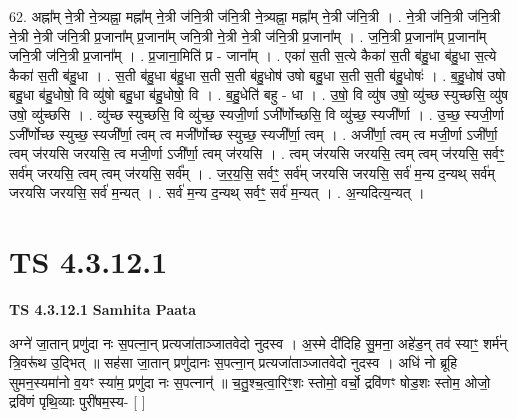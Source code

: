 \documentclass[17pt]{extarticle}
\begin{document}
62. अह्ना᳚म् ने॒त्री ने॒त्र्यह्ना॒ मह्ना᳚म् ने॒त्री ज॑नि॒त्री ज॑नि॒त्री ने॒त्र्यह्ना॒ मह्ना᳚म् ने॒त्री ज॑नि॒त्री । . ने॒त्री ज॑नि॒त्री ज॑नि॒त्री ने॒त्री ने॒त्री ज॑नि॒त्री प्र॒जाना᳚म् प्र॒जाना᳚म् जनि॒त्री ने॒त्री ने॒त्री ज॑नि॒त्री प्र॒जाना᳚म् । . ज॒नि॒त्री प्र॒जाना᳚म् प्र॒जाना᳚म् जनि॒त्री ज॑नि॒त्री प्र॒जाना᳚म् । . प्र॒जाना॒मिति॑ प्र - जाना᳚म् । . एका॑ स॒ती स॒त्ये कैका॑ स॒ती ब॑हु॒धा ब॑हु॒धा स॒त्ये कैका॑ स॒ती ब॑हु॒धा । . स॒ती ब॑हु॒धा ब॑हु॒धा स॒ती स॒ती ब॑हु॒धोष॑ उषो बहु॒धा स॒ती स॒ती ब॑हु॒धोषः॑ । . ब॒हु॒धोष॑ उषो बहु॒धा ब॑हु॒धोषो॒ वि व्यु॑षो बहु॒धा ब॑हु॒धोषो॒ वि । . ब॒हु॒धेति॑ बहु - धा । . उ॒षो॒ वि व्यु॑ष उषो॒ व्यु॑च्छ स्युच्छसि॒ व्यु॑ष उषो॒ व्यु॑च्छसि । . व्यु॑च्छ स्युच्छसि॒ वि व्यु॑च्छ॒ स्यजी॒र्णा ऽजी᳚र्णोच्छसि॒ वि व्यु॑च्छ॒ स्यजी᳚र्णा । . उ॒च्छ॒ स्यजी॒र्णा ऽजी᳚र्णोच्छ स्युच्छ॒ स्यजी᳚र्णा॒ त्वम् त्व मजी᳚र्णोच्छ स्युच्छ॒ स्यजी᳚र्णा॒ त्वम् । . अजी᳚र्णा॒ त्वम् त्व मजी॒र्णा ऽजी᳚र्णा॒ त्वम् ज॑रयसि जरयसि॒ त्व मजी॒र्णा ऽजी᳚र्णा॒ त्वम् ज॑रयसि । . त्वम् ज॑रयसि जरयसि॒ त्वम् त्वम् ज॑रयसि॒ सर्वꣳ॒॒ सर्व॑म् जरयसि॒ त्वम् त्वम् ज॑रयसि॒ सर्व᳚म् । . ज॒र॒य॒सि॒ सर्वꣳ॒॒ सर्व॑म् जरयसि जरयसि॒ सर्व॑ म॒न्य द॒न्यथ् सर्व॑म् जरयसि जरयसि॒ सर्व॑ म॒न्यत् । . सर्व॑ म॒न्य द॒न्यथ् सर्वꣳ॒॒ सर्व॑ म॒न्यत् । . अ॒न्यदित्य॒न्यत् । \newline
\pagebreak
{}

\section{ TS 4.3.12.1 }

\textbf{TS 4.3.12.1 } \newline
\textbf{Samhita Paata} \newline

अग्ने॑ जा॒तान् प्रणु॑दा नः स॒पत्ना॒न् प्रत्यजा॑ताञ्जातवेदो नुदस्व । अ॒स्मे दी॑दिहि सु॒मना॒ अहे॑ड॒न् तव॑ स्याꣳ॒॒ शर्म॑न् त्रि॒वरू॑थ उ॒द्भित् ॥ सह॑सा जा॒तान् प्रणु॑दानः स॒पत्ना॒न् प्रत्यजा॑ताञ्जातवेदो नुदस्व । अधि॑ नो ब्रूहि सुमन॒स्यमा॑नो व॒यꣳ स्या॑म॒ प्रणु॑दा नः स॒पत्नान्॑ ॥ च॒तु॒श्च॒त्वा॒रिꣳ॒॒शः स्तोमो॒ वर्चो॒ द्रवि॑णꣳ षोड॒शः स्तोम॒ ओजो॒ द्रवि॑णं पृथि॒व्याः पुरी॑षम॒स्य- [  ] \newline
\end{document}
